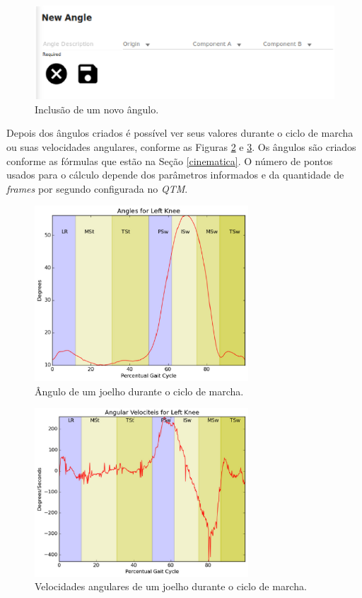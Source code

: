 \begin{figure}[H]
	\centering
	\includegraphics[width=15cm]{figuras/tela24.eps}
	\caption{Inclusão de um novo ângulo.}
\label{tela24}
\end{figure}


Depois dos ângulos criados é possível ver seus valores durante o ciclo de marcha ou suas velocidades angulares, conforme as Figuras \ref{tela25} e \ref{tela26}.
Os ângulos são criados conforme as fórmulas que estão na Seção \ref{cinematica}. O número de pontos usados para o cálculo depende dos parâmetros informados e da quantidade de \emph{frames} por segundo configurada no \emph{QTM}.
\begin{figure}[H]
	\centering
	\includegraphics[width=8cm]{figuras/tela25.eps}
	\caption{Ângulo de um joelho durante o ciclo de marcha.}
\label{tela25}
\end{figure}

\begin{figure}[H]
	\centering
	\includegraphics[width=8cm]{figuras/tela26.eps}
	\caption{Velocidades angulares de um joelho durante o ciclo de marcha.}
\label{tela26}
\end{figure}


